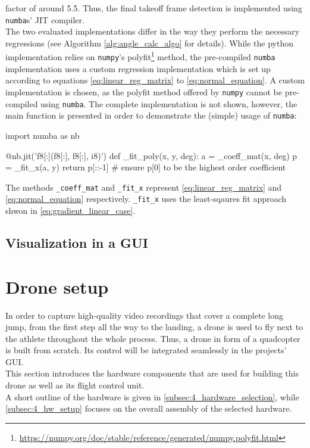factor of around 5.5.
Thus, the final takeoff frame detection is implemented using \texttt{numba}s'
JIT compiler.\\
The two evaluated implementations differ in the way they perform the necessary
regressions (see Algorithm \ref{alg:angle_calc_algo} for details).
While the python implementation relies on \texttt{numpy}'s
polyfit\footnote{\url{https://numpy.org/doc/stable/reference/generated/numpy.polyfit.html}}
method, the pre-compiled \texttt{numba} implementation uses a custom
regression implementation which is set up according to equations
\ref{eq:linear_reg_matrix} to \ref{eq:normal_equation}.
A custom implementation is chosen, as the polyfit method offered by
\texttt{numpy} cannot be pre-compiled using \texttt{numba}.
The complete implementation is not shown, however, the main function is
presented in order to demonstrate the (simple) usage of \texttt{numba}:

\begin{pythoncode}[caption=Polynomial regression,label=alg:poly_fit_numba]
    import numba as nb

    @nb.jit('f8[:](f8[:], f8[:], i8)')
    def _fit_poly(x, y, deg):
        a = _coeff_mat(x, deg)
        p = _fit_x(a, y)
        return p[::-1] # ensure p[0] to be the highest order coefficient
\end{pythoncode}
The methods \texttt{\_coeff\_mat} and \texttt{\_fit\_x} represent
\autoref{eq:linear_reg_matrix} and \autoref{eq:normal_equation} respectively.
\texttt{\_fit\_x} uses the least-sqaures fit approach shwon in
\autoref{eq:gradient_linear_case}.

\subsection{Visualization in a \acs*{GUI}}\label{subsec:4_lj_software_gui}

\section{Drone setup}\label{sec:4_hardware}
In order to capture high-quality video recordings that cover a complete long 
jump, from the first step all the way to the landing, a drone is used to fly
next to the athlete throughout the whole process.
Thus, a drone in form of a quadcopter is built from scratch.
Its control will be integrated seamlessly in the projects' \ac{GUI}.\\
This section introduces the hardware components that are used for building 
this drone as well as its flight control unit.\\
A short outline of the hardware is given in 
\autoref{subsec:4_hardware_selection},
while \autoref{subsec:4_hw_setup} focuses on the overall assembly of the 
selected hardware.

